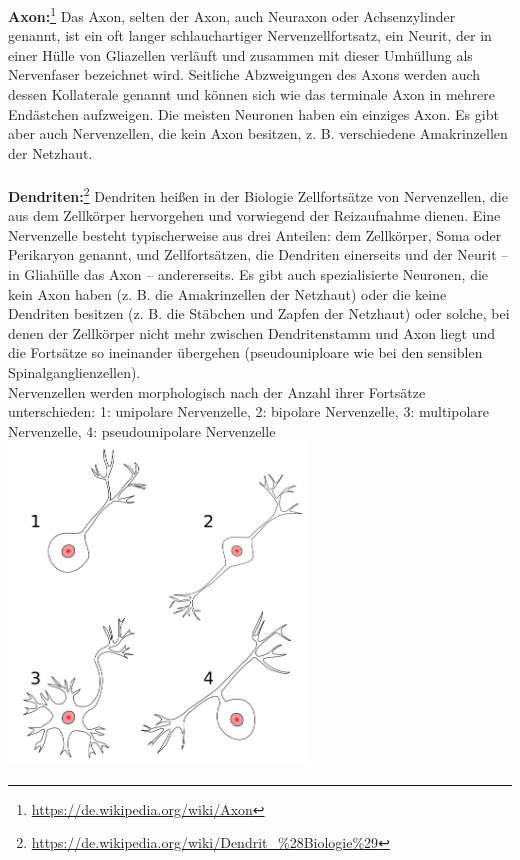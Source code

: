 \textbf{Axon:}\footnote{\url{https://de.wikipedia.org/wiki/Axon}} Das Axon, selten der Axon, auch Neuraxon oder Achsenzylinder genannt, ist ein oft langer schlauchartiger Nervenzellfortsatz, ein Neurit, der in einer Hülle von Gliazellen verläuft und zusammen mit dieser Umhüllung als Nervenfaser bezeichnet wird. Seitliche Abzweigungen des Axons werden auch dessen Kollaterale genannt und können sich wie das terminale Axon in mehrere Endästchen aufzweigen. Die meisten Neuronen haben ein einziges Axon. Es gibt aber auch Nervenzellen, die kein Axon besitzen, z. B. verschiedene Amakrinzellen der Netzhaut.
\\\\
\textbf{Dendriten:}\footnote{\url{https://de.wikipedia.org/wiki/Dendrit_\%28Biologie\%29}} Dendriten heißen in der Biologie Zellfortsätze von Nervenzellen, die aus dem Zellkörper hervorgehen und vorwiegend der Reizaufnahme dienen. Eine Nervenzelle besteht typischerweise aus drei Anteilen: dem Zellkörper, Soma oder Perikaryon genannt, und Zellfortsätzen, die Dendriten einerseits und der Neurit – in Gliahülle das Axon – andererseits. Es gibt auch spezialisierte Neuronen, die kein Axon haben (z. B. die Amakrinzellen der Netzhaut) oder die keine Dendriten besitzen (z. B. die Stäbchen und Zapfen der Netzhaut) oder solche, bei denen der Zellkörper nicht mehr zwischen Dendritenstamm und Axon liegt und die Fortsätze so ineinander übergehen (pseudouniploare wie bei den sensiblen Spinalganglienzellen).
\\
Nervenzellen werden morphologisch nach der Anzahl ihrer Fortsätze unterschieden:
1: unipolare Nervenzelle, 2: bipolare Nervenzelle, 3: multipolare Nervenzelle, 4: pseudounipolare Nervenzelle\\
\includegraphics[width=0.6\textwidth]{lectures/160405/pix/dendrite.jpg}

